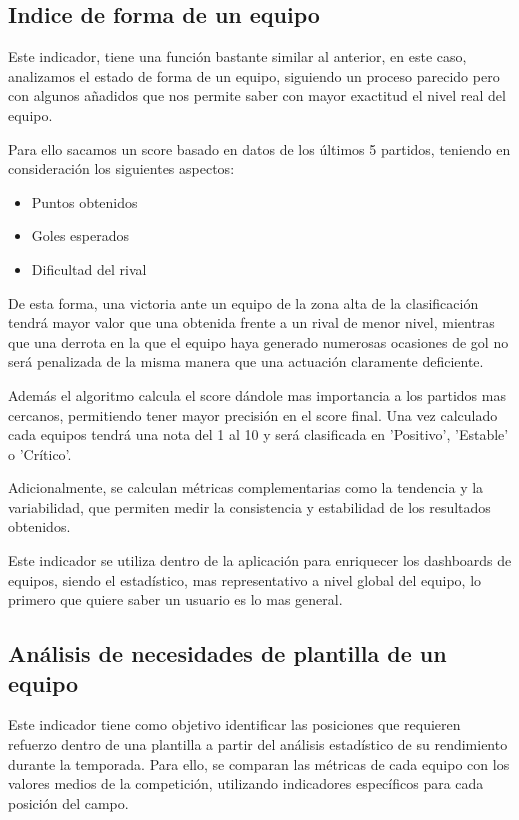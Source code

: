 \subsection{Indice de forma de un equipo}
Este indicador, tiene una función bastante similar al anterior, en este caso, analizamos el estado de forma de un equipo, siguiendo un proceso parecido pero con algunos añadidos que nos permite saber con mayor exactitud el nivel real del equipo.

Para ello sacamos un score basado en datos de los últimos 5 partidos, teniendo en consideración los siguientes aspectos:
\begin{itemize}
    \item Puntos obtenidos
    \item Goles esperados
    \item Dificultad del rival
\end{itemize}
De esta forma, una victoria ante un equipo de la zona alta de la clasificación tendrá mayor valor que una obtenida frente a un rival de menor nivel, mientras que una derrota en la que el equipo haya generado numerosas ocasiones de gol no será penalizada de la misma manera que una actuación claramente deficiente.

Además el algoritmo calcula el score dándole mas importancia a los partidos mas cercanos, permitiendo tener mayor precisión en el score final. Una vez calculado cada equipos tendrá una nota del 1 al 10 y será clasificada en 'Positivo', 'Estable' o 'Crítico'.

Adicionalmente, se calculan métricas complementarias como la tendencia y la variabilidad, que permiten medir la consistencia y estabilidad de los resultados obtenidos.

Este indicador se utiliza dentro de la aplicación para enriquecer los dashboards de equipos, siendo el estadístico, mas representativo a nivel global del equipo, lo primero que quiere saber un usuario es lo mas general.

\subsection{Análisis de necesidades de plantilla de un equipo}

Este indicador tiene como objetivo identificar las posiciones que requieren refuerzo dentro de una plantilla a partir del análisis estadístico de su rendimiento durante la temporada. Para ello, se comparan las métricas de cada equipo con los valores medios de la competición, utilizando indicadores específicos para cada posición del campo.

